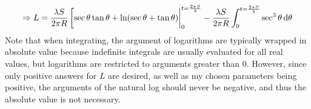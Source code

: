 \begin{equation*}
    \Rightarrow L = \frac{\lambda S}{2\pi R}\eval[\sec{\theta}\tan{\theta}+\ln(\sec{\theta}+\tan{\theta})|_0^{t =\frac{2\pi S}{\lambda}} - \frac{\lambda S}{2\pi R}\int_0^{t =\frac{2\pi S}{\lambda}}\sec^3{\theta} \dd{\theta}
\end{equation*}
Note that when integrating, the argument of logarithms are typically wrapped in absolute value because indefinite integrals are usually evaluated for all real values, but logarithms are restricted to arguments greater than 0. However, since only positive answers for $L$ are desired, as well as my chosen parameters being positive, the arguments of the natural log should never be negative, and thus the absolute value is not necessary.

